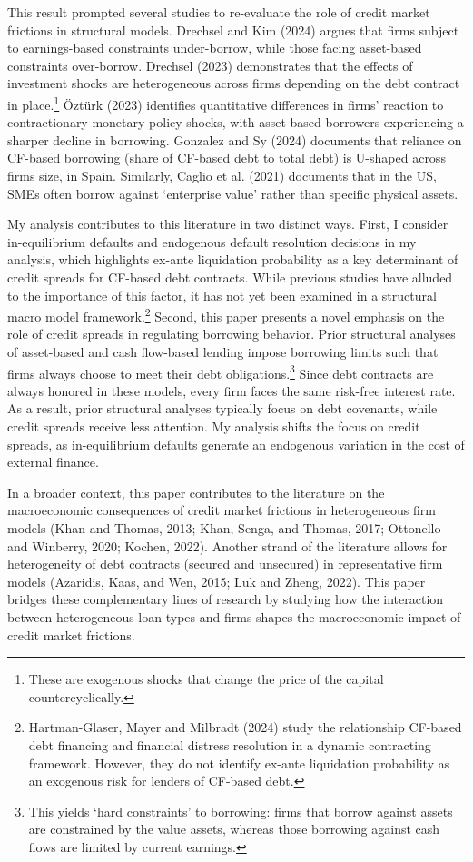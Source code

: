 \documentclass[12pt]{article}
\begin{document}
This result prompted several studies to re-evaluate the role of credit market frictions in structural models. Drechsel and Kim (2024) argues that firms subject to earnings-based constraints under-borrow, while those facing asset-based constraints over-borrow. Drechsel (2023) demonstrates that the effects of investment shocks are heterogeneous across firms depending on the debt contract in place.\footnote{These are exogenous shocks that change the price of the capital countercyclically.} Öztürk (2023) identifies quantitative differences in firms' reaction to contractionary monetary policy shocks, with asset-based borrowers experiencing a sharper decline in borrowing. Gonzalez and Sy (2024) documents that reliance on CF-based borrowing (share of CF-based debt to total debt) is U-shaped across firms size, in Spain. Similarly, Caglio et al. (2021) documents that in the US, SMEs often borrow against `enterprise value' rather than specific physical assets.

My analysis contributes to this literature in two distinct ways. First, I consider in-equilibrium defaults and endogenous default resolution decisions in my analysis, which highlights ex-ante liquidation probability as a key determinant of credit spreads for CF-based debt contracts. While previous studies have alluded to the importance of this factor, it has not yet been examined in a structural macro model framework.\footnote{Hartman-Glaser, Mayer and Milbradt (2024) study the relationship CF-based debt financing and financial distress resolution in a dynamic contracting framework. However, they do not identify ex-ante liquidation probability as an exogenous risk for lenders of CF-based debt.} Second, this paper presents a novel emphasis on the role of credit spreads in regulating borrowing behavior. Prior structural analyses of asset-based and cash flow-based lending impose borrowing limits such that firms always choose to meet their debt obligations.\footnote{This yields `hard constraints' to borrowing: firms that borrow against assets are constrained by the value assets, whereas those borrowing against cash flows are limited by current earnings.} Since debt contracts are always honored in these models, every firm faces the same risk-free interest rate. As a result, prior structural analyses typically focus on debt covenants, while credit spreads receive less attention. My analysis shifts the focus on credit spreads, as in-equilibrium defaults generate an endogenous variation in the cost of external finance. 

In a broader context, this paper contributes to the literature on the macroeconomic consequences of credit market frictions in heterogeneous firm models (Khan and Thomas, 2013; Khan, Senga, and Thomas, 2017; Ottonello and Winberry, 2020; Kochen, 2022). Another strand of the literature allows for heterogeneity of debt contracts (secured and unsecured) in representative firm models (Azaridis, Kaas, and Wen, 2015; Luk and Zheng, 2022). This paper bridges these complementary lines of research by studying how the interaction between heterogeneous loan types and firms shapes the macroeconomic impact of credit market frictions.
\end{document}
